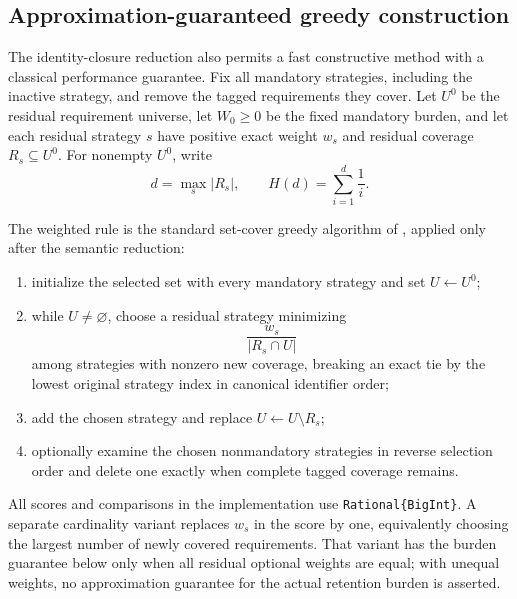 \subsection{Approximation-guaranteed greedy construction}
\label{subsec:aor-weighted-greedy}

The identity-closure reduction also permits a fast constructive method with a
classical performance guarantee.  Fix all mandatory strategies, including the
inactive strategy, and remove the tagged requirements they cover.  Let
$U^0$ be the residual requirement universe, let $W_0\geq 0$ be the fixed
mandatory burden, and let each residual strategy $s$ have positive exact
weight $w_s$ and residual coverage $R_s\subseteq U^0$.  For nonempty $U^0$,
write
\[
 d=\max_s |R_s|,
 \qquad
 H(d)=\sum_{i=1}^d\frac1i.
\]

The weighted rule is the standard set-cover greedy algorithm of
\citet{Chvatal1979}, applied only after the semantic reduction:

\begin{enumerate}
\item initialize the selected set with every mandatory strategy and set
      $U\leftarrow U^0$;
\item while $U\neq\varnothing$, choose a residual strategy minimizing
      \[
        \frac{w_s}{|R_s\cap U|}
      \]
      among strategies with nonzero new coverage, breaking an exact tie by
      the lowest original strategy index in canonical identifier order;
\item add the chosen strategy and replace
      $U\leftarrow U\setminus R_s$;
\item optionally examine the chosen nonmandatory strategies in reverse
      selection order and delete one exactly when complete tagged coverage
      remains.
\end{enumerate}

All scores and comparisons in the implementation use
\texttt{Rational\{BigInt\}}.  A separate cardinality variant replaces
$w_s$ in the score by one, equivalently choosing the largest number of newly
covered requirements.  That variant has the burden guarantee below only when
all residual optional weights are equal; with unequal weights, no
approximation guarantee for the actual retention burden is asserted.

